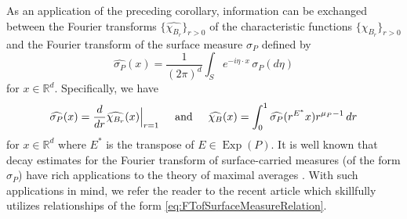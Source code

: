 \documentclass[11pt]{article}
\theoremstyle{remark}
\newcommand\Exp{\operatorname{Exp}}
\begin{document}
\noindent As an application of the preceding corollary, information can be exchanged between the Fourier transforms $\{\widehat{\chi_{B_r}}\}_{r>0}$ of the characteristic functions $\{\chi_{B_r}\}_{r>0}$ and the Fourier transform of the surface measure $\sigma_P$ defined by
\begin{equation*}
\widehat{\sigma_P}(x)=\frac{1}{(2\pi)^d}\int_{S} e^{-i\eta\cdot x}\,\sigma_P(d\eta)
\end{equation*}
for $x\in\mathbb{R}^d$. Specifically, we have
\begin{equation}\label{eq:FTofSurfaceMeasureRelation}
\widehat{\sigma_P}(x)=\frac{d}{dr}\widehat{\chi_{B_r}}(x)\Big\vert_{r=1}\hspace{0.5cm}\mbox{and}\hspace{0.5cm}\widehat{\chi_B}(x)=\int_0^1\widehat{\sigma_P}(r^{E^*}x)r^{\mu_P-1}\,dr
\end{equation}
for $x\in\mathbb{R}^d$ where $E^*$ is the transpose of $E\in\Exp(P)$. It is well known that decay estimates for the Fourier transform of surface-carried measures (of the form $\sigma_P$) have rich applications to the theory of maximal averages \cite{stein_harmonic_1993}.  With such applications in mind, we refer the reader to the recent article \cite{greenblatt_fourier_2021} which skillfully utilizes relationships of the form \eqref{eq:FTofSurfaceMeasureRelation}.
\end{document}
